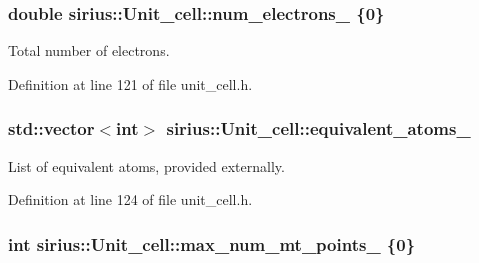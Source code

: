 \subsubsection[{num\+\_\+electrons\+\_\+}]{\setlength{\rightskip}{0pt plus 5cm}double sirius\+::\+Unit\+\_\+cell\+::num\+\_\+electrons\+\_\+ \{0\}\hspace{0.3cm}{\ttfamily [private]}}\label{classsirius_1_1_unit__cell_acf4750818ca4a8f1bae847a34879d16e}


Total number of electrons. 



Definition at line 121 of file unit\+\_\+cell.\+h.

\hypertarget{classsirius_1_1_unit__cell_a2c9eea8e1e25c25a75851e8cdafff370}{}
\subsubsection[{equivalent\+\_\+atoms\+\_\+}]{\setlength{\rightskip}{0pt plus 5cm}std\+::vector$<$int$>$ sirius\+::\+Unit\+\_\+cell\+::equivalent\+\_\+atoms\+\_\+\hspace{0.3cm}{\ttfamily [private]}}\label{classsirius_1_1_unit__cell_a2c9eea8e1e25c25a75851e8cdafff370}


List of equivalent atoms, provided externally. 



Definition at line 124 of file unit\+\_\+cell.\+h.

\hypertarget{classsirius_1_1_unit__cell_af8042706572062065441da33fa8cc575}{}
\subsubsection[{max\+\_\+num\+\_\+mt\+\_\+points\+\_\+}]{\setlength{\rightskip}{0pt plus 5cm}int sirius\+::\+Unit\+\_\+cell\+::max\+\_\+num\+\_\+mt\+\_\+points\+\_\+ \{0\}\hspace{0.3cm}{\ttfamily [private]}}\label{classsirius_1_1_unit__cell_af8042706572062065441da33fa8cc575}


